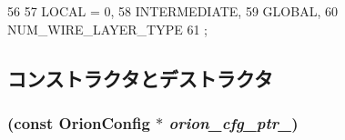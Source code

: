 \begin{DoxyCode}
56     {
57       LOCAL = 0,
58       INTERMEDIATE,
59       GLOBAL,
60       NUM_WIRE_LAYER_TYPE
61     };
\end{DoxyCode}


\subsection{コンストラクタとデストラクタ}
\hypertarget{classTechParameter_a2ffd46eddf786e3de753d29604516edb}{
\subsubsection[{TechParameter}]{ (const {\bf OrionConfig} $\ast$ {\em orion\_\-cfg\_\-ptr\_\-})}}
\label{classTechParameter_a2ffd46eddf786e3de753d29604516edb}



